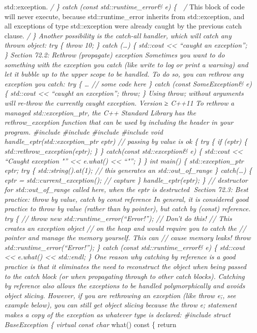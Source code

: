 std::exception. \emph{/ \} catch (const std::runtime\_error\& e) \{  /}
This block of code will never execute, because std::runtime\_error
inherits from std::exception, and all exceptions of type std::exception
were already caught by the previous catch clause. \emph{/ \} Another
possibility is the catch-all handler, which will catch any thrown
object: try \{ throw 10; \} catch (\ldots) \{ std::cout
\textless\textless{} ``caught an exception''; \} Section 72.2: Rethrow
(propagate) exception Sometimes you want to do something with the
exception you catch (like write to log or print a warning) and let it
bubble up to the upper scope to be handled. To do so, you can rethrow
any exception you catch: try \{ \ldots{} // some code here \} catch
(const SomeException\& e) \{ std::cout \textless\textless{} ``caught an
exception''; throw; \} Using throw; without arguments will re-throw the
currently caught exception. Version ≥ C++11 To rethrow a managed
std::exception\_ptr, the C++ Standard Library has the rethrow\_exception
function that can be used by including the header in your program.
\#include \#include \#include \#include void
handle\_eptr(std::exception\_ptr eptr) // passing by value is ok \{ try
\{ if (eptr) \{ std::rethrow\_exception(eptr); \} \} catch(const
std::exception\& e) \{ std::cout \textless\textless{} ``Caught exception
"'' \textless\textless{} e.what() \textless\textless{} ``"\n''; \} \}
int main() \{ std::exception\_ptr eptr; try \{ std::string().at(1); //
this generates an std::out\_of\_range \} catch(\ldots) \{ eptr =
std::current\_exception(); // capture \} handle\_eptr(eptr); \} //
destructor for std::out\_of\_range called here, when the eptr is
destructed Section 72.3: Best practice: throw by value, catch by const
reference In general, it is considered good practice to throw by value
(rather than by pointer), but catch by (const) reference. try \{ //
throw new std::runtime\_error(``Error!''); // Don't do this! // This
creates an exception object // on the heap and would require you to
catch the // pointer and manage the memory yourself. This can // cause
memory leaks! throw std::runtime\_error(``Error!''); \} catch (const
std::runtime\_error\& e) \{ std::cout \textless\textless{} e.what()
\textless\textless{} std::endl; \} One reason why catching by reference
is a good practice is that it eliminates the need to reconstruct the
object when being passed to the catch block (or when propagating through
to other catch blocks). Catching by reference also allows the exceptions
to be handled polymorphically and avoids object slicing. However, if you
are rethrowing an exception (like throw e;, see example below), you can
still get object slicing because the throw e; statement makes a copy of
the exception as whatever type is declared: \#include struct
BaseException \{ virtual const char} what() const \{ return
